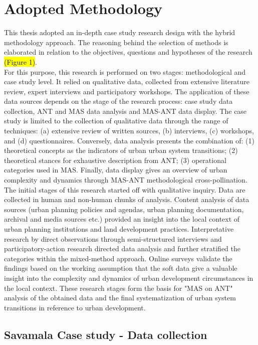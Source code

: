 \documentclass[11pt]{report}
\begin{document}
\section{Adopted Methodology}

This thesis adopted an in-depth case study research design with the hybrid methodology approach. The reasoning behind the selection of methods is elaborated in relation to the objectives, questions and hypotheses of the research \hl{(Figure 1)}.  
\\
For this purpose, this research is performed on two stages: methodological and case study level. It relied on qualitative data, collected from extensive literature review, expert interviews and participatory workshops. The application of these data sources depends on the stage of the research process: case study data collection, ANT and MAS data analysis and MAS-ANT data display. The case study is limited to the collection of qualitative data through the range of techniques: (a) extensive review of written sources, (b) interviews, (c) workshops, and (d) questionnaires. Conversely, data analysis presents the combination of: (1) theoretical concepts as the indicators of urban urban system transitions; (2) theoretical stances for exhaustive description from ANT; (3) operational categories used in MAS. Finally, data display gives an overview of urban complexity and dynamics through MAS-ANT methodological cross-pollination. 
\\
The initial stages of this research started off with qualitative inquiry. Data are collected in human and non-human chunks of analysis. Content analysis of data sources (urban planning policies and agendas, urban planning documentation, archival and media sources etc.) provided an insight into the local context of urban planning institutions and land development practices. Interpretative research by  direct observations through semi-structured interviews and participatory-action research directed data analysis and further stratified the categories within the mixed-method approach.
Online surveys validate the findings based on the working assumption that the soft data give a valuable insight into the complexity and dynamics of urban development circumstances in the local context. These research stages form the basis for "MAS on ANT" analysis of the obtained data and the final systematization of urban system transitions in reference to urban development.

\subsection{Savamala Case study - Data collection} \label{sec:predis}
\end{document}
